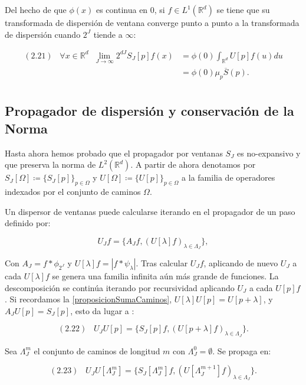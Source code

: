 \noindent Del hecho de que $\phi(x)$ es continua en 0, si $f\in L^1 (\mathbb{R}^d)$ se tiene que su transformada de dispersión de ventana converge punto a punto a la transformada de dispersión cuando $2^J$ tiende a $\infty$: 


\begin{align*}
    (2.21) \;\;\; \forall x \in \mathbb{R}^d \;\; \lim_{J \rightarrow \infty} 2^{dJ} S_J[p]f(x) &=\phi(0)\int_{\mathbb{R}^d}U[p]f(u) du \\
    &= \phi(0)\mu_p\overline{S}(p).\\ 
\end{align*}

\subsection{Propagador de dispersión y conservación de la Norma} \label{ch:seccion13}

\noindent Hasta ahora hemos probado que el propagador por ventanas $S_J$ es no-expansivo y que preserva la norma de $L^2(\mathbb{R}^d)$. A partir de ahora denotamos por $S_J[\Omega] \coloneqq \lbrace S_J[p] \rbrace_{p\in\Omega}$ y $U[\Omega]\coloneqq \lbrace U[p] \rbrace_{p\in\Omega}$ a la familia de operadores indexados por el conjunto de caminos $\Omega$.

\medskip

\noindent Un dispersor de ventanas puede calcularse iterando en el propagador de un paso definido por: 

$$U_Jf=\lbrace A_Jf, (U[\lambda]f)_{\lambda\in\Lambda_J} \rbrace,$$

Con $A_J=f\ast \phi_{2^J}$ y $U[\lambda]f=\left| f\ast \psi_\lambda \right|$. Tras calcular $U_Jf$, aplicando de nuevo $U_J$ a cada $U[\lambda]f$ se genera una familia infinita aún más grande de funciones. La descomposición se continúa iterando  por recursividad aplicando $U_J$ a cada $U[p]f$. Si recordamos la \autoref{proposicionSumaCaminos}, $U[\lambda]U[p]=U[p+\lambda]$, y $A_JU[p]=S_J[p]$, esto da lugar a : 

$$(2.22) \;\;\; U_JU[p]=\lbrace S_J[p]f,(U[p+\lambda]f)_{\lambda\in\Lambda_J}\rbrace.$$

\medskip

\noindent Sea $\Lambda_J^m$ el conjunto de caminos de longitud $m$ con $\Lambda_J^0={\emptyset}$. Se propaga en: 

$$(2.23) \;\;\; U_J U[\Lambda_J^m]=\lbrace S_J[\Lambda_J^m]f,(U[\Lambda_J^{m+1}]f)_{\lambda\in\Lambda_J}\rbrace.$$

